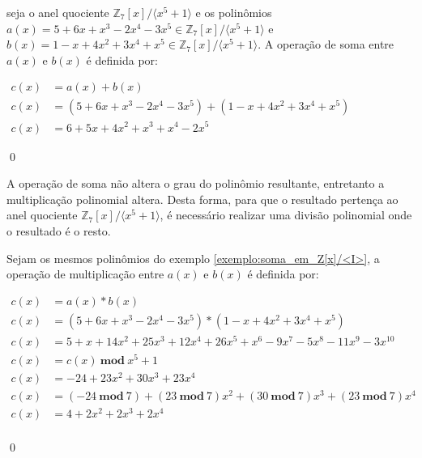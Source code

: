     \begin{exemplo}
    \label{exemplo:soma_em_Z[x]/<I>}
        seja o anel quociente $\mathbb{Z}_7[x] / \langle x^5+1 \rangle$ e os polinômios $a(x) = 5 + 6x + x^3 - 2x^4 - 3x^5 \in \mathbb{Z}_7[x] / \langle x^5+1 \rangle$ e $b(x) = 1 - x + 4x^2 + 3x^4 + x^5 \in \mathbb{Z}_7[x] / \langle x^5+1 \rangle$. A operação de soma entre $a(x)$ e $b(x)$ é definida por:

        \begin{center}
            $\begin{array}{rl}
                c(x) &= a(x) + b(x)\\
                c(x) &= (5 + 6x + x^3 - 2x^4 - 3x^5) + (1 - x + 4x^2 + 3x^4 + x^5)\\
                c(x) &= 6 + 5x + 4x^2 + x^3 + x^4 - 2x^5
            \end{array}$
        \end{center}
    \qed
    \end{exemplo}

    A operação de soma não altera o grau do polinômio resultante, entretanto a multiplicação polinomial altera. Desta forma, para que o resultado pertença ao anel quociente $\mathbb{Z}_7[x] / \langle x^5+1 \rangle$, é necessário realizar uma divisão polinomial onde o resultado é o resto.

    \begin{exemplo}
    \label{exemplo:multiplicacao_em_Z[x]/<I>}
        Sejam os mesmos polinômios do exemplo \ref{exemplo:soma_em_Z[x]/<I>}, a operação de multiplicação entre $a(x)$ e $b(x)$ é definida por:

        \begin{center}
            $\begin{array}{rl}
                c(x) &= a(x) * b(x)\\
                c(x) &= (5 + 6x + x^3 - 2x^4 - 3x^5) * (1 - x + 4x^2 + 3x^4 + x^5)\\
                c(x) &= 5 + x + 14x^2 + 25x^3 + 12x^4 + 26x^5 + x^6 - 9x^7 - 5x^8 - 11x^9 - 3x^{10}\\
                c(x) &= c(x)\ \textbf{mod}\ x^5 + 1\\ 
                c(x) &= -24 + 23x^2 + 30x^3 + 23x^4\\
                c(x) &= (-24\ \textbf{mod}\ 7) + (23\ \textbf{mod}\ 7)x^2 + (30\ \textbf{mod}\ 7)x^3 + (23\ \textbf{mod}\ 7)x^4\\
                c(x) &= 4 + 2x^2 + 2x^3 + 2x^4\\
            \end{array}$
        \end{center}
    
    \qed
    \end{exemplo}
    
